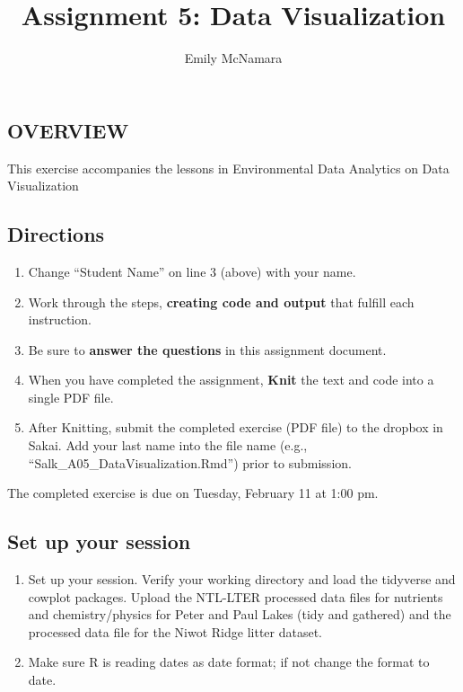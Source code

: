 \documentclass[]{article}
\title{Assignment 5: Data Visualization}
\author{Emily McNamara}
\date{}
\providecommand{\tightlist}{%
  \setlength{\itemsep}{0pt}\setlength{\parskip}{0pt}}
\begin{document}
\maketitle

\subsection{OVERVIEW}\label{overview}

This exercise accompanies the lessons in Environmental Data Analytics on
Data Visualization

\subsection{Directions}\label{directions}

\begin{enumerate}
\def\labelenumi{\arabic{enumi}.}
\tightlist
\item
  Change ``Student Name'' on line 3 (above) with your name.
\item
  Work through the steps, \textbf{creating code and output} that fulfill
  each instruction.
\item
  Be sure to \textbf{answer the questions} in this assignment document.
\item
  When you have completed the assignment, \textbf{Knit} the text and
  code into a single PDF file.
\item
  After Knitting, submit the completed exercise (PDF file) to the
  dropbox in Sakai. Add your last name into the file name (e.g.,
  ``Salk\_A05\_DataVisualization.Rmd'') prior to submission.
\end{enumerate}

The completed exercise is due on Tuesday, February 11 at 1:00 pm.

\subsection{Set up your session}\label{set-up-your-session}

\begin{enumerate}
\def\labelenumi{\arabic{enumi}.}
\item
  Set up your session. Verify your working directory and load the
  tidyverse and cowplot packages. Upload the NTL-LTER processed data
  files for nutrients and chemistry/physics for Peter and Paul Lakes
  (tidy and gathered) and the processed data file for the Niwot Ridge
  litter dataset.
\item
  Make sure R is reading dates as date format; if not change the format
  to date.
\end{enumerate}
\end{document}
